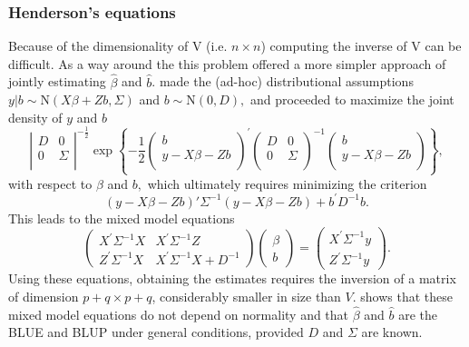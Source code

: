 \documentclass[MAIN.tex]{subfiles}
\begin{document}
	\subsubsection{Henderson's equations}
	Because of the dimensionality of V (i.e. $n \times n$) computing the inverse of V can be difficult. As a way around the this problem \citet{Henderson53, Henderson59,Henderson63,Henderson73,Henderson84a} offered a more simpler approach of jointly estimating $\hat{\beta}$ and $\hat{b}$.
	\cite{Henderson:1950} made the (ad-hoc) distributional assumptions $y|b \sim \mathrm{N} (X \beta + Zb, \Sigma)$ and $b \sim \mathrm{N}(0,D),$ and proceeded to maximize the joint density of $y$ and $b$
	\begin{equation}
	\left|
	\begin{array}{cc}
	D & 0 \\
	0 & \Sigma \\
	\end{array}
	\right|^{-\frac{1}{2}}
	\exp
	\left\{ -\frac{1}{2}
	\left(
	\begin{array}{c}
	b \\
	y - X \beta -Zb \\
	\end{array}
	\right)^\prime
	\left( \begin{array}{cc}
	D & 0 \\
	0 & \Sigma \\
	\end{array}\right)^{-1}
	\left(
	\begin{array}{c}
	b \\
	y - X \beta -Zb \\
	\end{array}
	\right)
	\right\},
	\label{u&beta:JointDensity}
	\end{equation}
	with respect to $\beta$ and $b,$ which ultimately requires minimizing the criterion
	\begin{equation}
	(y - X \beta -Zb)'\Sigma^{-1}(y - X \beta -Zb) + b^\prime D^{-1}b.
	\label{Henderson:Criterion}
	\end{equation}
	This leads to the mixed model equations
	\begin{equation}
	\left(\begin{array}{cc}
	X^\prime\Sigma^{-1}X & X^\prime\Sigma^{-1}Z
	\\
	Z^\prime\Sigma^{-1}X & X^\prime\Sigma^{-1}X + D^{-1}
	\end{array}\right)
	\left(\begin{array}{c}
	\beta \\
	b
	\end{array}\right)
	=
	\left(\begin{array}{c}
	X^\prime\Sigma^{-1}y \\
	Z^\prime\Sigma^{-1}y
	\end{array}\right).
	\label{Henderson:Equations}
	\end{equation}
	Using these equations, obtaining the estimates requires the inversion of a matrix
	of dimension $p+q \times p+q$, considerably smaller in size than $V$. \citet{Henderson1963} shows that these mixed model equations do not depend on normality and that $\hat{\beta}$ and $\hat{b}$ are the BLUE and BLUP under general conditions, provided $D$ and $\Sigma$ are known.
	
\end{document}
